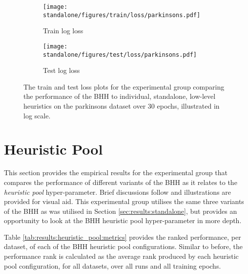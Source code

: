 \begin{figure}[H]
	\begin{subfigure}{0.5\textwidth}
		\centering
		\texttt{[image: standalone/figures/train/loss/parkinsons.pdf]}
		\caption{Train log loss}
		\label{fig:results:standalone:figures:loss:train:parkinsons}
	\end{subfigure}
	\begin{subfigure}{0.5\textwidth}
		\centering
		\texttt{[image: standalone/figures/test/loss/parkinsons.pdf]}
		\caption{Test log loss}
		\label{fig:results:standalone:figures:loss:test:parkinsons}
	\end{subfigure}
	\par\bigskip
	\caption{The train and test loss plots for the experimental group comparing the performance of the \acs{BHH} to individual, standalone, low-level heuristics on the parkinsons dataset over 30 epochs, illustrated in log scale.}
	\label{fig:results:standalone:figures:parkinsons}
\end{figure}




\section{Heuristic Pool}\label{sec:results:heuristic_pool}

This section provides the empirical results for the experimental group that compares the performance of different variants of the \acs{BHH} as it relates to the \textit{heuristic pool} hyper-parameter. Brief discussions follow and illustrations are provided for visual aid. This experimental group utilises the same three variants of the \acs{BHH} as was utilised in Section \ref{sec:results:standalone}, but provides an opportunity to look at the \acs{BHH} heuristic pool hyper-parameter in more depth.

Table \ref{tab:results:heuristic_pool:metrics} provides the ranked performance, per dataset, of each of the \acs{BHH} heuristic pool configurations. Similar to before, the performance rank is calculated as the average rank produced by each heuristic pool configuration, for all datasets, over all runs and all training epochs.


